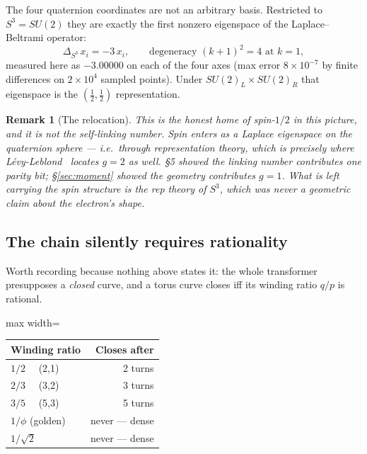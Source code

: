 \documentclass[11pt,a4paper]{article}
\newtheorem{remark}{Remark}
\begin{document}
The four quaternion coordinates are not an arbitrary basis.  Restricted
to $S^3 = SU(2)$ they are exactly the first nonzero eigenspace of the
Laplace--Beltrami operator:
\begin{equation}
\Delta_{S^3}\, x_i = -3\, x_i,
\qquad \text{degeneracy } (k+1)^2 = 4 \text{ at } k=1,
\end{equation}
measured here as $-3.00000$ on each of the four axes (max error
$8\times10^{-7}$ by finite differences on $2\times10^4$ sampled points).
Under $SU(2)_L \times SU(2)_R$ that eigenspace is the
$(\tfrac12,\tfrac12)$ representation.

\begin{remark}[The relocation]
This is the honest home of spin-$1/2$ in this picture, and it is not the
self-linking number.  Spin enters as a \emph{Laplace eigenspace on the
quaternion sphere} --- i.e.\ through representation theory, which is
precisely where L\'evy-Leblond~\cite{levyleblond1967} locates $g = 2$ as
well.  \S5 showed the linking number contributes one parity bit;
\S\ref{sec:moment} showed the geometry contributes $g = 1$.  What is left
carrying the spin structure is the rep theory of $S^3$, which was never a
geometric claim about the electron's shape.
\end{remark}

\subsection{The chain silently requires rationality}

Worth recording because nothing above states it: the whole transformer
presupposes a \emph{closed} curve, and a torus curve closes iff its
winding ratio $q/p$ is rational.

\begin{center}
\begin{adjustbox}{max width=\linewidth}\begin{tabular}{@{}lr@{}}
\toprule
Winding ratio & Closes after \\
\midrule
$1/2$ \ \ (2,1) & 2 turns \\
$2/3$ \ \ (3,2) & 3 turns \\
$3/5$ \ \ (5,3) & 5 turns \\
$1/\phi$ (golden) & never --- dense \\
$1/\sqrt{2}$ & never --- dense \\
\bottomrule
\end{tabular}\end{adjustbox}
\end{center}
\end{document}

